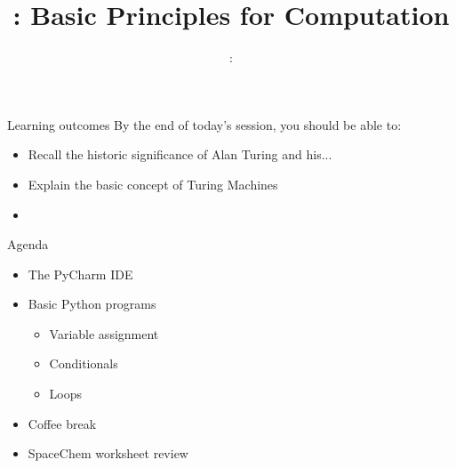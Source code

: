 \usepackage{../../beamerthemeFalmouthGamesAcademy}
\usepackage{multimedia}
\graphicspath{ {../../} }

\lstset{language=Python
}

\usepackage[normalem]{ulem}
\usepackage{wasysym}

\usepackage{pdfpages}

\usetikzlibrary{arrows,automata}




\title{\sessionnumber: Basic Principles for Computation}
\subtitle{\modulecode: \moduletitle}

\frame{\titlepage} 

\begin{frame}{Learning outcomes}
	By the end of today's session, you should be able to:
	\begin{itemize}
		\item Recall the historic significance of Alan Turing and his...
		\item Explain the basic concept of Turing Machines
		\item 
	\end{itemize}
\end{frame}

\begin{frame}{Agenda}
	\begin{itemize}
		\item The PyCharm IDE
		\item Basic Python programs
			\begin{itemize}
				\item Variable assignment
				\item Conditionals
				\item Loops
			\end{itemize}
		\item Coffee break
		\item SpaceChem worksheet review
	\end{itemize}
\end{frame}

